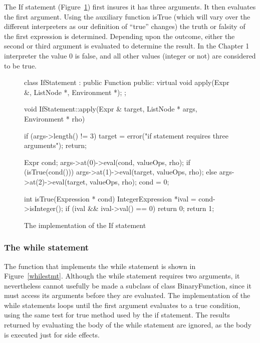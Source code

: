 The If statement (Figure~\ref{ifstatement}) first insures it has three
arguments.  It then evaluates the first argument.  Using the auxiliary
function {\sf isTrue} (which will vary over the different interpreters as
our definition of ``true'' changes) the truth or falsity of the first
expression is determined.  Depending upon the outcome, either the second or
third argument is evaluated to determine the result.
In the Chapter 1 interpreter the value 0 is false, and all other values
(integer or not) are considered to be true.

\begin{figure}
\begin{cprog}
class IfStatement : public Function {
public:
	virtual void apply(Expr &, ListNode *, Environment *);
};

void IfStatement::apply(Expr & target, ListNode * args, Environment * rho)
{
	if (args->length() != 3) {
		target = error("if statement requires three arguments");
		return;
		}

	Expr cond;
	args->at(0)->eval(cond, valueOps, rho);
	if (isTrue(cond()))
		args->at(1)->eval(target, valueOps, rho);
	else
		args->at(2)->eval(target, valueOps, rho);
	cond = 0;
}

int isTrue(Expression * cond)
{
	IntegerExpression *ival = cond->isInteger();
	if (ival && ival->val() == 0)
		return 0;
	return 1;
}
\end{cprog}
\caption{The implementation of the If statement}\label{ifstatement}
\end{figure}

\subsubsection{The while statement}

The function that implements the while statement is shown in
Figure~\ref{whilestmt}.  Although the while statement requires two
arguments, it nevertheless cannot usefully be made a subclass of class {\sf
BinaryFunction}, since it must access its arguments before they are evaluated.
The implementation of the while statements loops until the first argument
evaluates to a true condition, using the same test for true method used by
the if statement.  The results returned by evaluating the body of the while
statement are ignored, as the body is executed just for side effects.


